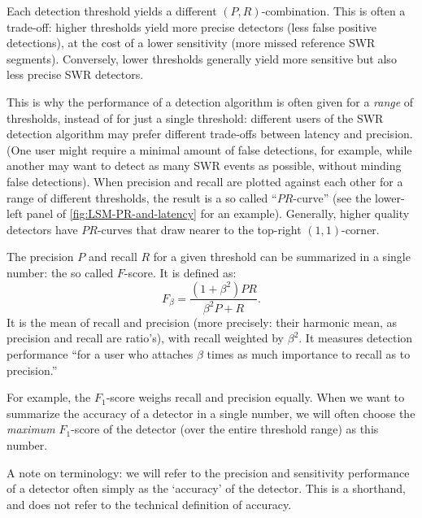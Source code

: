 Each detection threshold yields a different $(P, R)$-combination. This is often a trade-off: higher thresholds yield more precise detectors (less false positive detections), at the cost of a lower sensitivity (more missed reference SWR segments). Conversely, lower thresholds generally yield more sensitive but also less precise SWR detectors.

This is why the performance of a detection algorithm is often given for a \emph{range} of thresholds, instead of for just a single threshold: different users of the SWR detection algorithm may prefer different trade-offs between latency and precision. (One user might require a minimal amount of false detections, for example, while another may want to detect as many SWR events as possible, without minding false detections). When precision and recall are plotted against each other for a range of different thresholds, the result is a so called ``$PR$-curve'' (see the lower-left panel of \cref{fig:LSM-PR-and-latency} for an example). Generally, higher quality detectors have $PR$-curves that draw nearer to the top-right $(1, 1)$-corner.

The precision $P$ and recall $R$ for a given threshold can be summarized in a single number: the so called $F$-score. It is defined as:
\begin{equation}
F_\beta = \frac{(1+\beta^2) P R}{\beta^2 P + R}.
\end{equation}
It is the mean of recall and precision (more precisely: their harmonic mean, as precision and recall are ratio's), with recall weighted by $\beta^2$. It measures detection performance ``for a user who attaches $\beta$ times as much importance to recall as to precision.'' \cite{Rijsbergen1979}

For example, the $F_1$-score weighs recall and precision equally. When we want to summarize the accuracy of a detector in a single number, we will often choose the \emph{maximum} $F_1$-score of the detector (over the entire threshold range) as this number.

A note on terminology: we will refer to the precision and sensitivity performance of a detector often simply as the `accuracy' of the detector. This is a shorthand, and does not refer to the technical definition of accuracy.\footnotemark{}





